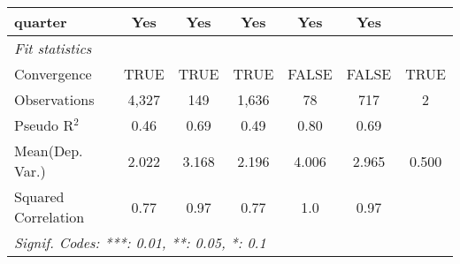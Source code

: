 \begin{tabular}{lcccccc}
   quarter                                                    & Yes            & Yes           & Yes           & Yes     & Yes           & \\  
   \midrule
   \emph{Fit statistics}\\
   Convergence                                                &TRUE            & TRUE          & TRUE          & FALSE   & FALSE         & TRUE\\  
   Observations                                               & 4,327          & 149           & 1,636         & 78      & 717           & 2\\  
   Pseudo R$^2$                                               & 0.46           & 0.69          & 0.49          & 0.80    & 0.69          & \\  
Mean(Dep. Var.) & 2.022 & 3.168 & 2.196 & 4.006 & 2.965 & 0.500 \\
   Squared Correlation                                        & 0.77           & 0.97          & 0.77          & 1.0     & 0.97          & \\  
   \midrule \midrule
   \multicolumn{7}{l}{\emph{Signif. Codes: ***: 0.01, **: 0.05, *: 0.1}}\\
\end{tabular}
\par\endgroup
